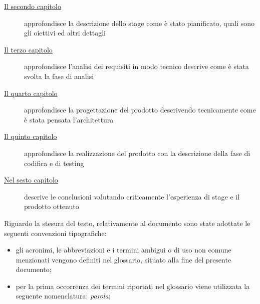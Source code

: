 \begin{description}
  \item[{\hyperref[cap:descrizione-stage]{Il secondo capitolo}}] approfondisce la descrizione dello stage come è stato pianificato, quali sono gli oiettivi ed altri dettagli

  \item[{\hyperref[cap:analisi-requisiti]{Il terzo capitolo}}] approfondisce l'analisi dei requisiti in modo tecnico descrive come è stata svolta la fase di analisi

  \item[{\hyperref[cap:progettazione]{Il quarto capitolo}}] approfondisce la progettazione del prodotto descrivendo tecnicamente come è stata pensata l'architettura

  \item[{\hyperref[cap:realizzazione]{Il quinto capitolo}}] approfondisce la realizzazione del prodotto con la descrizione della fase di codifica e di testing

  \item[{\hyperref[cap:conclusioni]{Nel sesto capitolo}}] descrive le conclusioni valutando criticamente l'esperienza di stage e il prodotto ottenuto
\end{description}

Riguardo la stesura del testo, relativamente al documento sono state adottate le seguenti convenzioni tipografiche:
\begin{itemize}
  \item gli acronimi, le abbreviazioni e i termini ambigui o di uso non comune menzionati vengono definiti nel glossario, situato alla fine del presente documento;
  \item per la prima occorrenza dei termini riportati nel glossario viene utilizzata la seguente nomenclatura: \emph{parola}\glsfirstoccur;
\end{itemize}

